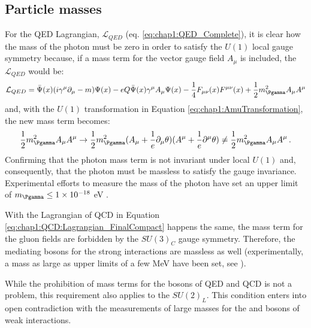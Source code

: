 \subsection{Particle masses}
\label{sec:chap1:ParticleMasses}
For the QED Lagrangian, $\mathcal{L}_{QED}$  (eq. \ref{eq:chap1:QED_Complete}), it is clear how the mass of the photon must be zero in order to satisfy the $U(1)$ local gauge symmetry because,
if a mass term for the vector gauge field $A_{\mu}$ is included, the $\mathcal{L}_{QED}$ would be:
\begin{equation*}\label{eq:chap1:QED_massivephoton}
	\mathcal{L}_{QED} =  \bar{\Psi}(x) (i  \gamma^{\mu} \partial_{\mu} - m ) \Psi(x) - eQ \bar{\Psi}(x) \gamma^{\mu}A_{\mu} \Psi(x) - \frac{1}{4}F_{\mu \nu}(x) F^{\mu \nu}(x) + \frac{1}{2}m_{\Pgamma}^{2}A_{\mu}A^{\mu}
\end{equation*}
and, with the $U(1)$ transformation in Equation \ref{eq:chap1:AmuTransformation}, the new mass term becomes: 
\begin{equation*}
	\frac{1}{2}m_{\Pgamma}^{2}A_{\mu}A^{\mu} \rightarrow \frac{1}{2}m_{\Pgamma}^{2} (A_{\mu} + \frac{1}{e}\partial_{\mu}\theta ) (A^{\mu} +\frac{1}{e}\partial^{\mu}\theta) \neq \frac{1}{2}m_{\Pgamma}^{2}A_{\mu}A^{\mu}\, .
\end{equation*}
Confirming that the photon mass term is not invariant under local $U(1)$ and, consequently, that the photon must be massless to satisfy the gauge invariance.
Experimental efforts to measure the mass of the photon have set an upper limit of  $m_{\Pgamma} \leq 1 \times 10^{-18} $ eV \cite{Ryutov:2007zz}.

With the Lagrangian of QCD in Equation \ref{eq:chap1:QCD:Lagrangian_FinalCompact} happens the same, the mass term for the gluon fields are forbidden 
by the $SU(3)_{C}$ gauge symmetry. Therefore, the mediating bosons for the strong interactions are massless as well (experimentally, a mass as large as upper limits
of a few MeV have been set, see \cite{Yndurain:1995uq}).


While the prohibition of mass terms for the bosons of QED and QCD is not a problem, this requirement also applies to the $SU(2)_L$.
This condition enters into open contradiction with the measurements of large masses for the
\PW and \PZ bosons of weak interactions.


